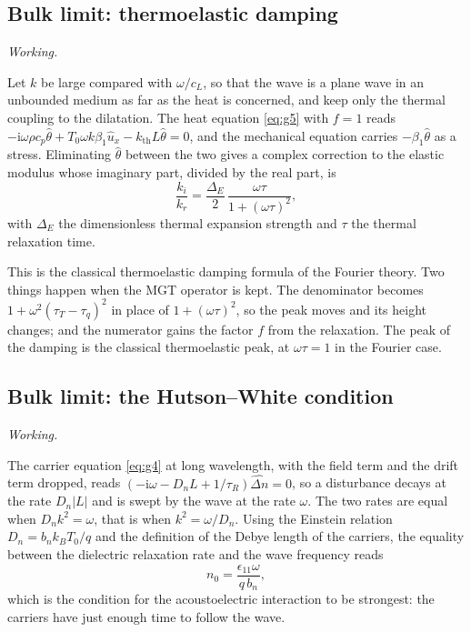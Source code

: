 \documentclass[11pt,a4paper]{article}
\newif\ifshowworked \showworkedtrue
\newenvironment{worked}{\ifshowworked\par\smallskip\noindent\textit{Working.}\par\else\setbox0\vbox\bgroup\fi}{\ifshowworked\par\smallskip\else\egroup\fi}
\newcommand{\ii}{\mathrm{i}}
\newcommand{\bx}{\hat u_x}
\newcommand{\bn}{\widehat{\Delta n}}
\newcommand{\bt}{\hat\theta}
\newcommand{\kB}{k_{\mathrm{th}}}
\begin{document}
\subsection{Bulk limit: thermoelastic damping}

\begin{worked}
Let $k$ be large compared with $\omega/c_L$, so that the wave is a plane wave in an unbounded medium as far
as the heat is concerned, and keep only the thermal coupling to the dilatation. The heat equation
\eqref{eq:g5} with $f=1$ reads
$-\ii\omega\rho c_p\bt+T_0\omega k\beta_1\bx-\kB L\bt=0$, and the mechanical equation carries $-\beta_1\bt$
as a stress. Eliminating $\bt$ between the two gives a complex correction to the elastic modulus whose
imaginary part, divided by the real part, is
\[
\frac{k_i}{k_r}=\frac{\Delta_E}{2}\,\frac{\omega\tau}{1+(\omega\tau)^2},
\]
with $\Delta_E$ the dimensionless thermal expansion strength and $\tau$ the thermal relaxation time.
\end{worked}

\noindent This is the classical thermoelastic damping formula of the Fourier theory. Two things happen when
the MGT operator is kept. The denominator becomes
$1+\omega^2(\tau_T-\tau_q)^2$ in place of $1+(\omega\tau)^2$, so the peak moves and its height changes; and
the numerator gains the factor $f$ from the relaxation. The peak of the damping is the classical
thermoelastic peak, at $\omega\tau=1$ in the Fourier case.

\subsection{Bulk limit: the Hutson--White condition}

\begin{worked}
The carrier equation \eqref{eq:g4} at long wavelength, with the field term and the drift term dropped,
reads $(-\ii\omega-D_nL+1/\tau_R)\bn=0$, so a disturbance decays at the rate $D_n|L|$ and is swept by the
wave at the rate $\omega$. The two rates are equal when $D_nk^2=\omega$, that is when
$k^2=\omega/D_n$. Using the Einstein relation $D_n=b_nk_BT_0/q$ and the definition of the Debye length of
the carriers, the equality between the dielectric relaxation rate and the wave frequency reads
\[
n_0=\frac{\epsilon_{11}\omega}{q\,b_n},
\]
which is the condition for the acoustoelectric interaction to be strongest: the carriers have just enough
time to follow the wave.
\end{worked}
\end{document}
